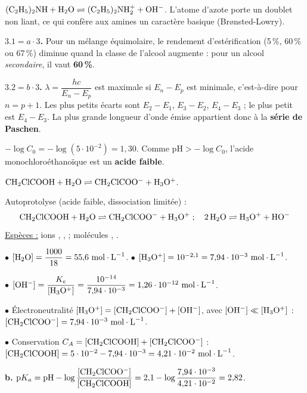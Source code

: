 \documentclass[11pt]{article}
\begin{document}
$\mathrm{(C_2H_5)_2NH + H_2O \rightleftharpoons (C_2H_5)_2NH_2^+ + OH^-}$. L'atome d'azote porte un doublet non liant, ce qui confère aux amines un caractère basique (Br\o nsted-Lowry).

\textbf{$3.1 = a\cdot 3$.} Pour un mélange équimolaire, le rendement d'estérification (5\,\%, 60\,\% ou 67\,\%) diminue quand la classe de l'alcool augmente : pour un alcool \emph{secondaire}, il vaut \textbf{60\,\%}.

\textbf{$3.2 = b\cdot 3$.} $\lambda = \dfrac{hc}{E_n - E_p}$ est maximale si $E_n - E_p$ est minimale, c'est-à-dire pour $n = p+1$. Les plus petits écarts sont $E_2 - E_1$, $E_3 - E_2$, $E_4 - E_3$ ; le plus petit est $E_4 - E_3$. La plus grande longueur d'onde émise appartient donc à la \textbf{série de Paschen}.


 $-\log C_0 = -\log(5\cdot10^{-2}) = 1{,}30$. Comme $\text{pH} > -\log C_0$, l'acide monochloroéthanoïque est un \textbf{acide faible}.

 $\mathrm{CH_2ClCOOH + H_2O \rightleftharpoons CH_2ClCOO^- + H_3O^+}$.

 Autoprotolyse (acide faible, dissociation limitée) :
\[ \mathrm{CH_2ClCOOH + H_2O \rightleftharpoons CH_2ClCOO^- + H_3O^+} \;;\quad \mathrm{2\,H_2O \rightleftharpoons H_3O^+ + HO^-} \]
\underline{Espèces :} ions , ,  ; molécules , .

$\bullet$ $[\ch{H_2O}] = \dfrac{1000}{18} = 55{,}6\ \text{mol}\cdot\text{L}^{-1}$. \quad $\bullet$ $[\mathrm{H_3O^+}] = 10^{-2{,}1} = 7{,}94\cdot10^{-3}\ \text{mol}\cdot\text{L}^{-1}$.

$\bullet$ $[\ch{OH^-}] = \dfrac{K_e}{[\ch{H_3O^+}]} = \dfrac{10^{-14}}{7{,}94\cdot10^{-3}} = 1{,}26\cdot10^{-12}\ \text{mol}\cdot\text{L}^{-1}$.

$\bullet$ Électroneutralité $[\mathrm{H_3O^+}] = [\mathrm{CH_2ClCOO^-}] + [\mathrm{OH^-}]$, avec $[\mathrm{OH^-}] \ll [\mathrm{H_3O^+}]$ : $[\ch{CH_2ClCOO^-}] = 7{,}94\cdot10^{-3}\ \text{mol}\cdot\text{L}^{-1}$.

$\bullet$ Conservation $C_A = [\mathrm{CH_2ClCOOH}] + [\mathrm{CH_2ClCOO^-}]$ : $[\ch{CH_2ClCOOH}] = 5\cdot10^{-2} - 7{,}94\cdot10^{-3} = 4{,}21\cdot10^{-2}\ \text{mol}\cdot\text{L}^{-1}$.

\textbf{b.} $\text{p}K_a = \text{pH} - \log\dfrac{[\mathrm{CH_2ClCOO^-}]}{[\mathrm{CH_2ClCOOH}]} = 2{,}1 - \log\dfrac{7{,}94\cdot10^{-3}}{4{,}21\cdot10^{-2}} = 2{,}82$.
\end{document}
